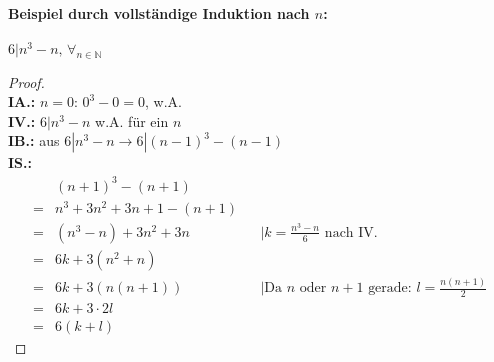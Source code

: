 \paragraph{Beispiel durch vollständige Induktion nach $n$:}$6|n^3 -n,\, \forall_{n\in\mathbb{N}}$\\
\begin{proof}
\ \\
\textbf{IA.:} $n=0$: $0^3-0=0$, w.A. \\
\textbf{IV.:} $6|n^3 -n$ w.A. für ein $n$ \\
\textbf{IB.:} aus $6|n^3 -n \rightarrow 6|(n-1)^3 -(n-1)$ \\
\textbf{IS.:}
\begin{align*}
&(n+1)^3 - (n+1) \\
= &n^3+3n^2+3n+1-(n+1) \\
= &(n^3-n) + 3n^2 + 3n && |k=\frac{n^3-n}{6} \text{ nach IV.}\\
= &6k +3(n^2+n) \\
= &6k + 3(n(n+1)) && |\text{Da $n$ oder $n+1$ gerade: } l=\frac{n(n+1)}{2} \\
= &6k+3\cdot 2l \\
= &6(k+l)
\end{align*}
\end{proof}


%